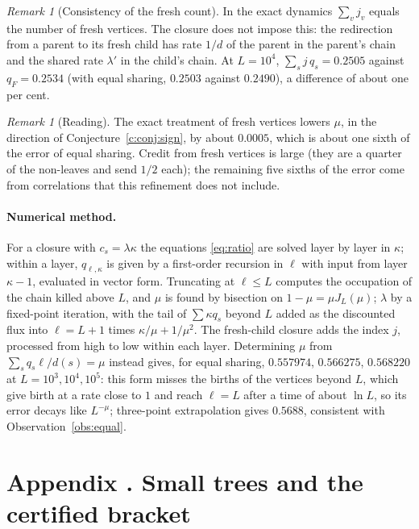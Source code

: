 \documentclass[11pt]{article}
\theoremstyle{plain}
\theoremstyle{definition}
\theoremstyle{remark}
\newtheorem{remark}[theorem]{Remark}
\begin{document}
\begin{remark}[Consistency of the fresh count]
In the exact dynamics $\sum_vj_v$ equals the number of fresh vertices. The closure does not impose this: the redirection from a parent to its fresh child has rate $1/d$ of the parent in the parent's chain and the shared rate $\lambda'$ in the child's chain. At $L=10^4$, $\sum_sj\,q_s=0.2505$ against $q_F=0.2534$ (with equal sharing, $0.2503$ against $0.2490$), a difference of about one per cent.
\end{remark}

\begin{remark}[Reading]
The exact treatment of fresh vertices lowers $\mu$, in the direction of Conjecture~\ref{c:conj:sign}, by about $0.0005$, which is about one sixth of the error of equal sharing. Credit from fresh vertices is large (they are a quarter of the non-leaves and send $1/2$ each); the remaining five sixths of the error come from correlations that this refinement does not include.
\end{remark}


\paragraph{Numerical method.} For a closure with $c_s=\lambda\kappa$ the equations \eqref{eq:ratio} are solved layer by layer in $\kappa$; within a layer, $q_{\ell,\kappa}$ is given by a first-order recursion in $\ell$ with input from layer $\kappa-1$, evaluated in vector form. Truncating at $\ell\le L$ computes the occupation of the chain killed above $L$, and $\mu$ is found by bisection on $1-\mu=\mu J_L(\mu)$; $\lambda$ by a fixed-point iteration, with the tail of $\sum\kappa q_s$ beyond $L$ added as the discounted flux into $\ell=L+1$ times $\kappa/\mu+1/\mu^2$. The fresh-child closure adds the index $j$, processed from high to low within each layer. Determining $\mu$ from $\sum_sq_s\ell/d(s)=\mu$ instead gives, for equal sharing, $0.557974$, $0.566275$, $0.568220$ at $L=10^3,10^4,10^5$: this form misses the births of the vertices beyond $L$, which give birth at a rate close to $1$ and reach $\ell=L$ after a time of about $\ln L$, so its error decays like $L^{-\mu}$; three-point extrapolation gives $0.5688$, consistent with Observation~\ref{obs:equal}.

\section*{Appendix \thesection. Small trees and the certified bracket}\label{app:smallN}
\end{document}
